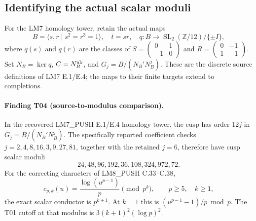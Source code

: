 \documentclass[11pt,a4paper]{article}
\begin{document}
\subsection{Identifying the actual scalar moduli}

For the LM7 homology tower, retain the actual maps
\[
 B=\langle s,r\mid s^2=r^3=1\rangle,
 \quad t=sr,\quad
 q:B\longrightarrow\operatorname{SL}_2(\mathbb Z/12)/\{\pm I\},
\]
where $q(s)$ and $q(r)$ are the classes of
$S=\left(\begin{smallmatrix}0&1\\-1&0\end{smallmatrix}\right)$ and
$R=\left(\begin{smallmatrix}0&-1\\1&-1\end{smallmatrix}\right)$.
Set $N_B=\ker q$, $C=N_B^{\rm ab}$, and
$G_j=B/(N_B'N_B^j)$. These are the discrete source definitions of
LM7 E.1/E.4; the maps to their finite targets extend to completions.

\paragraph{Finding T04 (source-to-modulus comparison).}
In the recovered LM7\_PUSH E.1/E.4 homology tower, the cusp has order
$12j$ in $G_j=B/(N_B'N_B^j)$. The specifically reported coefficient
checks $j=2,4,8,16,3,9,27,81$, together with the retained $j=6$, therefore
have cusp scalar moduli
\[
        24,48,96,192,36,108,324,972,72.
 \tag{T04.1}
\]
For the correcting characters of LM8\_PUSH C.33--C.38,
\[
 c_{p,k}(u)=\frac{\log(u^{p-1})}{p}\pmod{p^k},
 \qquad p\geq5,\quad k\geq1,
 \tag{T04.2}
\]
the exact scalar conductor is $p^{k+1}$. At $k=1$ this is
$(u^{p-1}-1)/p\bmod p$. The T01 cutoff at that modulus is
$3(k+1)^2(\log p)^2$.
\end{document}
